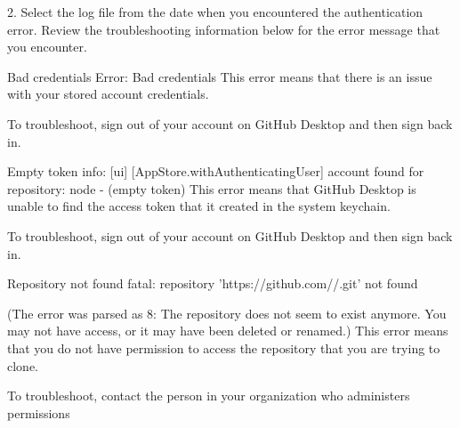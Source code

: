 2.	Select the log file from the date when you encountered the authentication error.
Review the troubleshooting information below for the error message that you encounter.

Bad credentials
Error: Bad credentials
This error means that there is an issue with your stored account credentials.

To troubleshoot, sign out of your account on GitHub Desktop and then sign back in.

Empty token
info: [ui] [AppStore.withAuthenticatingUser] account found for repository: node -  (empty token)
This error means that GitHub Desktop is unable to find the access token that it created in the system keychain.

To troubleshoot, sign out of your account on GitHub Desktop and then sign back in.

Repository not found
fatal: repository 'https://github.com//.git' not found

(The error was parsed as 8: The repository does not seem to exist anymore. You may not have access, or it may have been deleted or renamed.)
This error means that you do not have permission to access the repository that you are trying to clone.

To troubleshoot, contact the person in your organization who administers permissions